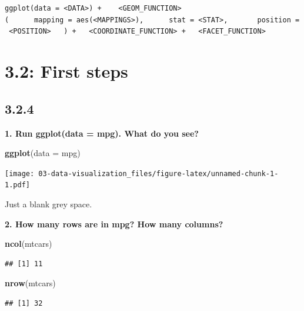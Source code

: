 \documentclass[]{book}
\newenvironment{Shaded}{\begin{snugshade}}{\end{snugshade}}
\newcommand{\DataTypeTok}[1]{\textcolor[rgb]{0.13,0.29,0.53}{#1}}
\newcommand{\KeywordTok}[1]{\textcolor[rgb]{0.13,0.29,0.53}{\textbf{#1}}}
\newcommand{\NormalTok}[1]{#1}
\theoremstyle{definition}
\theoremstyle{definition}
\theoremstyle{definition}
\theoremstyle{remark}
\begin{document}
\texttt{ggplot(data\ =\ \textless{}DATA\textgreater{})\ +\ \ \ \ \textless{}GEOM\_FUNCTION\textgreater{}(\ \ \ \ \ \ mapping\ =\ aes(\textless{}MAPPINGS\textgreater{}),\ \ \ \ \ \ stat\ =\ \textless{}STAT\textgreater{},\ \ \ \ \ \ \ position\ =\ \textless{}POSITION\textgreater{}\ \ \ )\ +\ \ \ \textless{}COORDINATE\_FUNCTION\textgreater{}\ +\ \ \ \textless{}FACET\_FUNCTION\textgreater{}}

\hypertarget{first-steps}{%
\section{3.2: First steps}\label{first-steps}}

\hypertarget{section}{%
\subsection{3.2.4}\label{section}}

\textbf{1. Run ggplot(data = mpg). What do you see?}

\begin{Shaded}
\begin{Highlighting}[]
\KeywordTok{ggplot}\NormalTok{(}\DataTypeTok{data =}\NormalTok{ mpg)}
\end{Highlighting}
\end{Shaded}

\texttt{[image: 03-data-visualization\_files/figure-latex/unnamed-chunk-1-1.pdf]}

Just a blank grey space.

\textbf{2. How many rows are in mpg? How many columns?}

\begin{Shaded}
\begin{Highlighting}[]
\KeywordTok{ncol}\NormalTok{(mtcars)}
\end{Highlighting}
\end{Shaded}

\begin{verbatim}
## [1] 11
\end{verbatim}

\begin{Shaded}
\begin{Highlighting}[]
\KeywordTok{nrow}\NormalTok{(mtcars)}
\end{Highlighting}
\end{Shaded}

\begin{verbatim}
## [1] 32
\end{verbatim}
\end{document}
